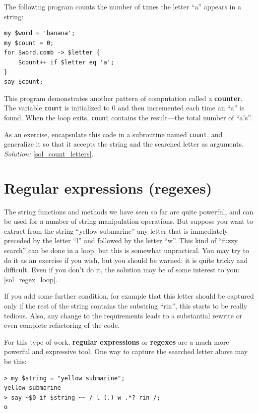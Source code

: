 The following program counts the number of times the 
letter ``a'' appears in a string:

\begin{verbatim}
my $word = 'banana';
my $count = 0;
for $word.comb -> $letter {
    $count++ if $letter eq 'a';
}
say $count;
\end{verbatim}
%

This program demonstrates another pattern of computation called a {\bf
counter}.  The variable {\tt count} is initialized to 0 and then
incremented each time an ``a'' is found.
When the loop exits, {\tt count}
contains the result---the total number of ``a's''.

As an exercise, encapsulate this code in a subroutine named 
{\tt count}, and generalize it so that it accepts the string
and the searched letter as arguments. \emph{Solution:} \ref{sol_count_letters}.
\label{count_letters}

\section{Regular expressions (regexes)}
\label{regex}

The string functions and methods we have seen so far are 
quite powerful, and can be used for a number of string 
manipulation operations. But suppose you want to extract 
from the string ``yellow submarine'' any letter that is 
immediately preceded by the letter ``l'' and followed by 
the letter ``w''. This kind of ``fuzzy search'' 
can be done in a loop, but this is 
somewhat unpractical. You may try to do it as an exercise if 
you wish, but you should be warned: it is quite tricky and 
difficult. Even if you don't do it, the solution may be of some 
interest to you: \ref{sol_regex_loop}. 
\label{regex_loop}


If you add some further condition, 
for example that this letter should be captured only if 
the rest of the string contains the substring ``rin'', 
this starts to be really tedious. Also, any change to the 
requirements leads to a substantial rewrite or even 
complete refactoring of the code.

For this type of work, {\bf regular expressions} or 
{\bf regexes}  are a much more powerful and expressive tool. 
One way to capture the searched letter above may be this:

\begin{verbatim}
> my $string = "yellow submarine";
yellow submarine
> say ~$0 if $string ~~ / l (.) w .*? rin /;
o
\end{verbatim}

